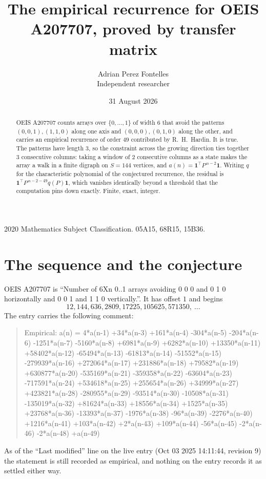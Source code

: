 \documentclass[11pt,a4paper]{article}
\title{The empirical recurrence for OEIS A207707, proved by transfer matrix}
\author{Adrian Perez Fontelles\\ \small Independent researcher}
\date{31 August 2026}
\theoremstyle{plain}
\theoremstyle{definition}
\begin{document}
\maketitle

\begin{abstract}
OEIS A207707 counts arrays over $\{0,\dots,1\}$ of width $6$ that avoid the patterns
$(0,0,1), (1,1,0)$ along one axis and $(0,0,0), (0,1,0)$ along the other, and carries an empirical recurrence of
order $49$ contributed by R.~H.~Hardin. It is true. The patterns have length $3$, so
the constraint across the growing direction ties together $3$ consecutive columns: taking a
window of $2$ consecutive columns as a state makes the array a walk in a finite digraph
on $S=144$ vertices, and $a(n)=\mathbf{1}^{\!\top}P^{\,n-2}\mathbf{1}$. Writing $q$
for the characteristic polynomial of the conjectured recurrence, the residual is
$\mathbf{1}^{\!\top}P^{\,n-2-49}q(P)\mathbf{1}$, which vanishes identically
beyond a threshold that the computation pins down exactly. Finite, exact, integer.
\end{abstract}

\noindent\small 2020 Mathematics Subject Classification. 05A15, 68R15, 15B36.\normalsize

\section{The sequence and the conjecture}

OEIS A207707 is ``Number of 6Xn 0..1 arrays avoiding 0 0 0 and 0 1 0 horizontally and 0 0 1 and 1 1 0 vertically.''. It has offset
$1$ and begins
\[
12, 144, 636, 2809, 17225, 105625, 571350,\ \dots
\]
The entry carries the following comment:
\begin{quote}\small
Empirical: a(n) = 4*a(n-1) +34*a(n-3) +161*a(n-4) -304*a(n-5) -204*a(n-6) -1251*a(n-7) -5160*a(n-8) +6981*a(n-9) +6282*a(n-10) +13350*a(n-11) +58402*a(n-12) -65494*a(n-13) -61813*a(n-14) -51552*a(n-15) -279939*a(n-16) +272064*a(n-17) +231886*a(n-18) +79582*a(n-19) +630877*a(n-20) -535169*a(n-21) -359358*a(n-22) -63604*a(n-23) -717591*a(n-24) +534618*a(n-25) +255654*a(n-26) +34999*a(n-27) +423821*a(n-28) -280955*a(n-29) -93514*a(n-30) -10508*a(n-31) -135019*a(n-32) +81624*a(n-33) +18556*a(n-34) +1525*a(n-35) +23768*a(n-36) -13393*a(n-37) -1976*a(n-38) -96*a(n-39) -2276*a(n-40) +1216*a(n-41) +103*a(n-42) +2*a(n-43) +109*a(n-44) -56*a(n-45) -2*a(n-46) -2*a(n-48) +a(n-49)
\end{quote}
As of the ``Last modified'' line on the live entry (Oct 03 2025 14:11:44, revision
9) the statement is still recorded as empirical, and nothing on the entry
records it as settled either way.
\end{document}
